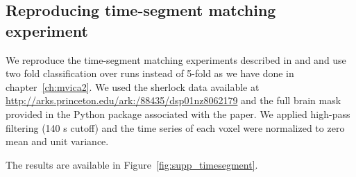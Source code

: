 



\subsection{Reproducing time-segment matching experiment}
\label{appendix_reproduce}
We reproduce the time-segment matching experiments described in \cite{chen2016convolutional} and \cite{zhang2016searchlight} and use two fold classification over runs instead of 5-fold as we have done in chapter~\ref{ch:mvica2}. We used the sherlock data available at \url{http://arks.princeton.edu/ark:/88435/dsp01nz8062179} and the full brain mask provided in the Python package associated with the paper. We applied high-pass filtering (140 s cutoff) and the time series of each voxel were normalized to zero mean and unit variance.

The results are available in Figure~\ref{fig:supp_timesegment}.

